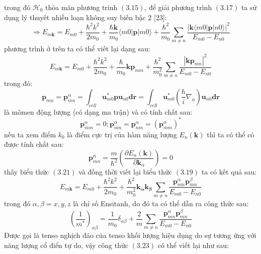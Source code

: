 trong đó $\mathcal{H}_0$ thỏa mãn phương trinh $(3.15)$, để giải phương trình $(3.17)$ ta sử dụng lý thuyết nhiễu loạn không suy biến bậc 2 [23]:
\begin{equation}
\Longrightarrow E_{m\mathbf{k}}=E_{m0}+\frac{\hbar^2 k^2}{2m_0}+\frac{\hbar\mathbf{k}}{m_0}\langle m0|\mathbf{p} |m0\rangle +\frac{\hbar^2}{m_0}\sum_{m \ne n}\frac{{|\mathbf{k}\langle m0|\mathbf{p} |n0\rangle |}^2}{E_{m0}-E_{n0}}
\end{equation}
phương trình ở trên ta có thể viết lại dạng sau:
\begin{equation}
 E_{m\mathbf{k}}=E_{m0}+\frac{\hbar^2 k^2}{2m_0}+\frac{\hbar}{m_0}\mathbf{kp}_{mm} +\frac{\hbar^2}{m_0^2}\sum_{m \ne n}\frac{{|\mathbf{k}\mathbf{p}_{mn} |}^2}{E_{m0}-E_{n0}}
\end{equation}
trong đó:
\begin{equation}
\mathbf{p}_{mn}=\mathbf{p}_{mn}^\alpha=\int_{cell}\mathbf{u}_{m0}^*\mathbf{p}\mathbf{u}_{n0}\mathbf{dr}=
\int_{cell}\mathbf{u}_{m0}^*\left(\frac{h}{i}\nabla_\alpha \right)\mathbf{u}_{n0}\mathbf{dr}
\end{equation}
là mômen động lượng (có dạng ma trận) và có tính chất sau:
\begin{equation}
\mathbf{p}_{mm}^\alpha = 0;\mathbf{p}_{mn}^\alpha =\mathbf{p}_{nm}^\alpha = \left(\mathbf{p}_{mm}^\alpha \right)^*
\end{equation}
nếu ta xem điểm $k_0$ là điểm cực trị của hàm năng lượng $E_{n}\left(\mathbf{k}\right)$ thì ta có thể có được tính chất sau:
\begin{equation}
\mathbf{p}_{mn}^\alpha = \frac{m}{\hbar ^2}\left(\frac{\partial E_n\left(\mathbf{k}\right)}{\partial \mathbf{k}_\alpha}\right) = 0
\end{equation}
thây biểu thức $(3.21)$ và đồng thời viết lại biểu thức $(3.19)$ ta có kết quả sau:
\begin{equation}
 E_{m\mathbf{k}}=E_{m0}+\frac{\hbar^2 k^2}{2m_0} +\frac{\hbar^2}{m_0^2}\mathbf{k_\alpha}\mathbf{k_\beta}\sum_{m \ne n}\frac{{\mathbf{p}_{mn}^\alpha \mathbf{p}_{mn}^\beta }}{E_{m0}-E_{n0}}
\end{equation}
trong đó $\alpha,\beta=x,y,z$ là chỉ số Ensitanh, do đó ta có thể dẫn ra công thức sau:
\begin{equation}
\left(\frac{1}{m^*}\right)_{\alpha\beta}=\frac{1}{m_0}\delta_{\alpha\beta} +\frac{2}{m}\sum_{m \ne n}\frac{{\mathbf{p}_{mn}^\alpha \mathbf{p}_{mn}^\beta }}{E_{m0}-E_{n0}}
\end{equation}
Được gọi là tenso nghịch đảo của tenso khối lượng hiệu dụng do sự tương ứng với năng lượng cổ điển tự do, vậy công thức $(3.23)$ có thể viết lại như sau:
